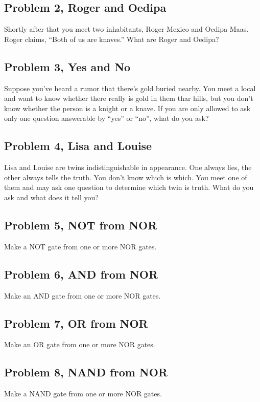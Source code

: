 \documentclass[11pt]{book}
\begin{document}
\subsection{Problem 2, Roger and Oedipa} 
Shortly after that you meet two inhabitants, Roger Mexico and Oedipa Maas. Roger claims, “Both of us are knaves.” What are Roger and Oedipa?


 
\subsection{Problem 3, Yes and No} 
Suppose you’ve heard a rumor that there’s gold buried nearby. You meet a local and want to know whether there really is gold in them thar hills, but you don’t know whether the person is a knight or a knave. If you are only allowed to ask only one question answerable by ``yes'' or ``no'', what do you ask?


\subsection{Problem 4, Lisa and Louise}
Lisa and Louise are twins indistinguishable in appearance. One always lies, the other always tells the truth. You don’t know which is which. You meet one of them and may ask one question to determine which twin is truth. What do you ask and what does it tell you?

\newpage

\subsection{Problem 5, NOT from NOR}
Make a NOT gate from one or more NOR gates.
\subsection{Problem 6, AND from NOR}
Make an AND gate from one or more NOR gates.
\subsection{Problem 7, OR from NOR}
Make an OR gate from one or more NOR gates.
\subsection{Problem 8, NAND from NOR}
Make a NAND gate from one or more NOR gates.
\end{document}
